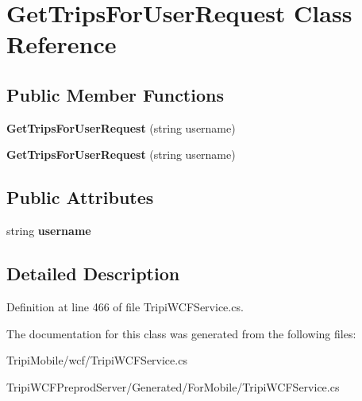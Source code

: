 \hypertarget{class_get_trips_for_user_request}{
\section{GetTripsForUserRequest Class Reference}
\label{class_get_trips_for_user_request}
}
\subsection*{Public Member Functions}
\begin{DoxyCompactItemize}
\item 
\hypertarget{class_get_trips_for_user_request_a9a34593305594dd377b641823d89df83}{
{\bfseries GetTripsForUserRequest} (string username)}
\label{class_get_trips_for_user_request_a9a34593305594dd377b641823d89df83}

\item 
\hypertarget{class_get_trips_for_user_request_a9a34593305594dd377b641823d89df83}{
{\bfseries GetTripsForUserRequest} (string username)}
\label{class_get_trips_for_user_request_a9a34593305594dd377b641823d89df83}

\end{DoxyCompactItemize}
\subsection*{Public Attributes}
\begin{DoxyCompactItemize}
\item 
\hypertarget{class_get_trips_for_user_request_a6083637c6a6bcfc687e13eca2eb462b1}{
string {\bfseries username}}
\label{class_get_trips_for_user_request_a6083637c6a6bcfc687e13eca2eb462b1}

\end{DoxyCompactItemize}


\subsection{Detailed Description}


Definition at line 466 of file TripiWCFService.cs.

The documentation for this class was generated from the following files:\begin{DoxyCompactItemize}
\item 
TripiMobile/wcf/TripiWCFService.cs\item 
TripiWCFPreprodServer/Generated/ForMobile/TripiWCFService.cs\end{DoxyCompactItemize}
